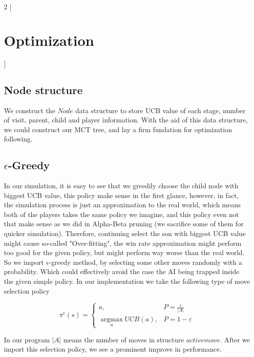 \documentclass[a4paper, 11pt]{article} %
\begin{document}
	\begin{multicols}{2}
		[
		\section{Optimization}
		]
		
		\subsection{Node structure}
		
		We construct the $Node$ data structure to store UCB value of each stage, number of visit, parent, child and player information. With the aid of this data structure, we could construct our MCT tree, and lay a firm fundation for optimization following.
		
		\subsection{$\epsilon$-Greedy}
		
		In our simulation, it is easy to see that we greedily choose the child node with biggest UCB value, this policy make sense in the first glance, however, in fact, the simulation process is just an approximation to the real world, which means both of the players takes the same policy we imagine, and this policy even not that make sense as we did in Alpha-Beta pruning (we sacrifice some of them for quicker simulation). Therefore, continuing select the son with biggest UCB value might cause so-called "Over-fitting", the win rate approximation might perform too good for the given policy, but might perform way worse than the real world. So we import $\epsilon$-greedy method, by selecting some other moves randomly with a probability. Which could effectively avoid the case the AI being trapped inside the given simple policy. In our implementation we take the following type of move selection policy
		
		\begin{equation*}
			\pi^{\epsilon}(s)=\left\{\begin{array}{cc}
				a, & P = \frac{\varepsilon}{|A|} \\
				\underset{a}{\operatorname{argmax}}  UCB(a), & P = 1-\varepsilon
			\end{array}\right.
		\end{equation*}
	
		In our program $|A|$ means the number of moves in structure $activemove$. After we import this selection policy, we see a prominent improve in performance.
		

\end{multicols}
\end{document}
